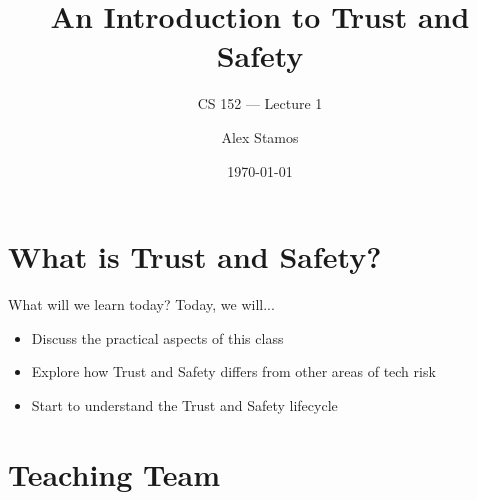 \documentclass[nobackground,dvipsnames,table]{beamer}
\title{An Introduction to Trust and Safety}
\subtitle{CS 152 --- Lecture 1}
\author[A. Stamos]{Alex Stamos}
\institute[SIO]{\large Stanford Internet Observatory}
\date[2022]{\today}
\begin{document}
\begin{frame}
    \titlepage
\end{frame}

\section{What is Trust and Safety?}

\begin{frame}{What will we learn today?}
    Today, we will...
    \begin{itemize}
        \item Discuss the practical aspects of this class
        \item Explore how Trust and Safety differs from other areas of tech risk
        \item Start to understand the Trust and Safety lifecycle
    \end{itemize}
\end{frame}

\section{Teaching Team}
\end{document}
